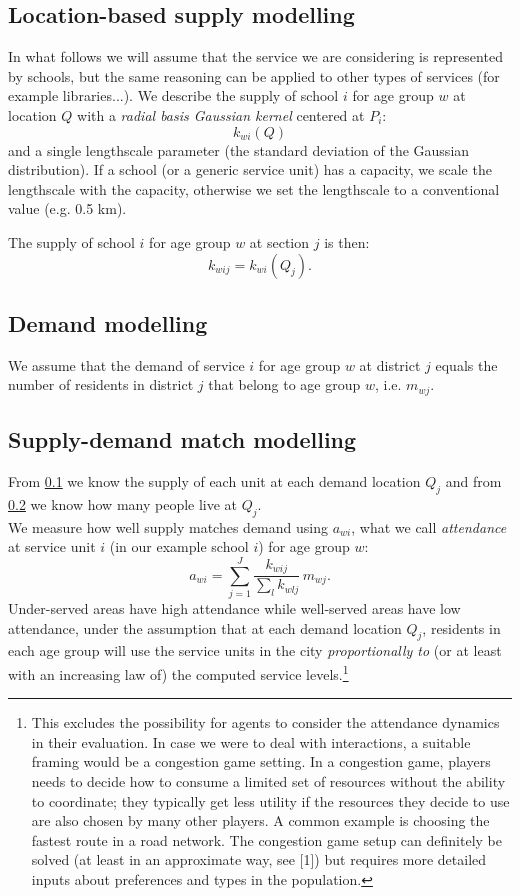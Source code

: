 \documentclass{article}
\begin{document}
\subsection{Location-based supply modelling} \label{supply}
In what follows we will assume that the service we are considering is represented by schools, but the same reasoning can be applied to other types of services (for example libraries...).
We describe the supply of school $i$ for age group $w$ at location $Q$ with a \textit{radial basis Gaussian kernel}  centered at $P_i$: 
\[k_{wi}(Q)\]
and a single lengthscale parameter (the standard deviation of the Gaussian distribution). If a school (or a generic service unit) has a capacity, we scale the lengthscale with the capacity, otherwise we set the lengthscale to a conventional value (e.g. 0.5 km).

The supply of school $i$ for age group $w$ at section $j$ is then:
\[k_{wij}=k_{wi}(Q_j).\]

\subsection{Demand modelling}  \label{demand}
We assume that the demand of service $i$ for age group $w$ at district $j$ equals the number of residents in district $j$ that belong to age group $w$, i.e. $m_{wj}$.

\subsection{Supply-demand match modelling}
From \ref{supply} we know the supply of each unit at each demand location $Q_j$ and from \ref{demand} we know how many people live at $Q_j$. \\

We measure how well supply matches demand using $a_{wi}$, what we call \textit{attendance} at service unit $i$ (in our example school $i$) for age group $w$: 
    \[a_{wi}=\sum_{j=1}^J{\frac{k_{wij}}{\sum_l{k_{wlj}}} \, m_{wj}}.\]
 Under-served areas have high attendance while well-served areas have low attendance, under the assumption that  at each demand location $Q_j$, residents in each age group will use the service units in the city \textit{proportionally to} (or at least with an increasing law of) the computed service levels.\footnote{This excludes the possibility for agents to consider the attendance dynamics in their evaluation. In case we were to deal with interactions, a suitable framing would be a congestion game setting. In a congestion game, players needs to decide how to consume a limited set of resources without the ability to coordinate; they typically get less utility if the resources they decide to use are also chosen by many other players. A common example is choosing the fastest route in a road network.
The congestion game setup can definitely be solved (at least in an approximate way, see [1]) but requires more detailed inputs about preferences and types in the population.}
\end{document}
